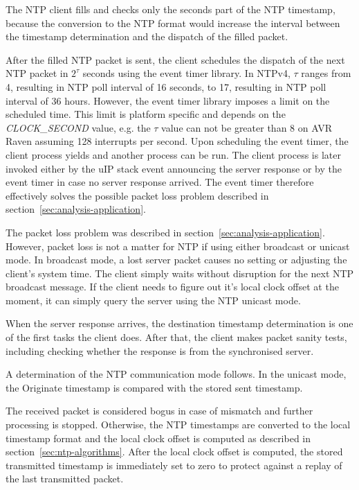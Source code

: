 The NTP client fills and checks only the seconds part of the NTP timestamp,
because the conversion to the NTP format would increase the interval
between the timestamp determination and the dispatch of the filled packet.

After the filled NTP packet is sent, the client schedules
the dispatch of the next NTP packet in $2^{\tau}$ seconds
using the event timer library.
In NTPv4, $\tau$ ranges from 4, resulting in NTP poll interval of 16 seconds,
to 17, resulting in NTP poll interval of 36 hours.
However, the event timer library imposes a limit on the scheduled time.
This limit is platform specific and depends on the {\it{CLOCK\_SECOND}} value,
e.g. the $\tau$ value can not be greater than 8 on AVR Raven assuming 128 interrupts per second.
Upon scheduling the event timer, the client process yields
and another process can be run.
The client process is later invoked either by the uIP stack event
announcing the server response
or by the event timer in case no server response arrived.
The event timer therefore effectively solves
the possible packet loss problem described in section~\ref{sec:analysis-application}.


The packet loss problem was described in section~\ref{sec:analysis-application}.
However, packet loss is not a matter for NTP if using either broadcast or unicast mode.
In broadcast mode, a lost server packet causes no setting or adjusting the client's system time.
The client simply waits without disruption for the next NTP broadcast message.
If the client needs to figure out it's local clock offset at the moment,
it can simply query the server using the NTP unicast mode.



When the server response arrives,
the destination timestamp determination is one of the first tasks the client does.
After that, the client makes packet sanity tests, including
checking whether the response is from the synchronised server.

A determination of the NTP communication mode follows.
In the unicast mode, the Originate timestamp is compared with the stored sent timestamp.

The received packet is considered bogus in case of mismatch and further processing is stopped.
Otherwise, the NTP timestamps are converted to the local timestamp format and
the local clock offset is computed as described in section~\ref{sec:ntp-algorithms}.
After the local clock offset is computed,
the stored transmitted timestamp is immediately set to zero
to protect against a replay of the last transmitted packet.

